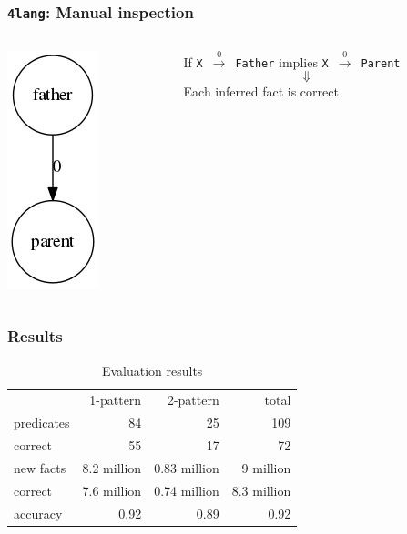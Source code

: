 \documentclass[bigger]{beamer}
\newcommand{\fl}{\texttt{4lang}\xspace}
\begin{document}
\begin{frame}
    \frametitle{\fl: Manual inspection}
    \begin{columns}
        \begin{column}{0.4\textwidth}
            \pause \includegraphics[scale=0.6]{pics/father.jpg}
        \end{column}
        \begin{column}{0.6\textwidth}
            \begin{figure}
                \centering
                \small
                If \texttt{X}~$\xrightarrow0$~\texttt{Father} implies \texttt{X}~$\xrightarrow0$~\texttt{Parent} 
                \pause \[\Downarrow\] Each inferred fact is correct
                \label{fig:manual}
            \end{figure}
        \end{column}
    \end{columns}
\end{frame}

\begin{frame}
\frametitle{Results}
\begin{table}
    \centering
    \begin{tabular}{lrrr}
                    & 1-pattern & 2-pattern & total\\
        predicates  & 84 & 25 & 109 \\
        correct     & 55 & 17 & 72 \\
        new facts   & 8.2 million & 0.83 million & 9 million \\
        correct     & 7.6 million & 0.74 million & 8.3 million \\ 
        accuracy    & 0.92 & 0.89 & 0.92
    \end{tabular}
    \caption{Evaluation results}
    \label{table:results}
\end{table}
\end{frame}
\end{document}

